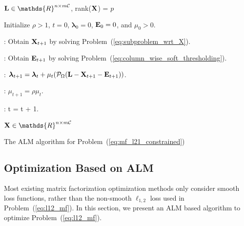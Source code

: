 \documentclass[letterpaper]{article} %
\def\calP{\mathcal{P}}
\def\bE{{\bf E}}
\def\blambda{{\bm \lambda}}
\def\calC{{\mathcal{C}}}
\def\bL{{\bf L}}
\def\dsR{\mathds{R}}
\def\bX{{\bf X}}
\def\bX{{\bf X}}
\begin{document}
\begin{algorithm}[ht]

\begin{algorithmic}

\REQUIRE $\bL \in \dsR^{n \times m\calC}$, rank($\bX$) = $p$

\STATE Initialize $\rho > 1$, $t = 0$, $\blambda_{0} = 0$, $\bE_{0} = 0$, and $\mu_{0} > 0$.

\WHILE{$t = 0$ or $L_1(\bE_{t+1}-\bE_{t}) \geq \epsilon$}


    : Obtain $\bX_{t+1}$ by solving Problem~(\ref{eq:subproblem_wrt_X}).

    : Obtain $\bE_{t+1}$ by solving Problem~(\ref{eq:column_wise_soft_thresholding}).

  \ENDWHILE

  : $\blambda_{t+1} = \blambda_{t} + \mu_{t} (\calP_{\Omega}{(\bL - \bX_{t+1} - \bE_{t+1})})$.

  : $\mu_{t+1} = \rho \mu_{t}$.

  : t = t + 1.

\ENDWHILE

\ENSURE $\bX \in \dsR^{n \times m\calC}$

\end{algorithmic}
\caption{The ALM algorithm for Problem~(\ref{eq:mf_l21_constrained})}
\label{alg:alm_mf}
\end{algorithm}

\subsection{Optimization Based on ALM}

Most existing matrix factorization optimization methods only consider smooth loss functions, rather than the non-smooth $\ell_{1,2}$ loss used in Problem~(\ref{eq:l12_mf}).
In this section, we present an ALM based algorithm to optimize Problem~(\ref{eq:l12_mf}).
\end{document}
